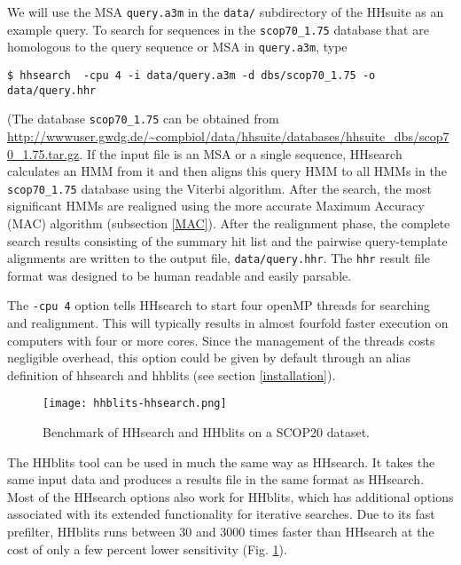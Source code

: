 \documentclass[11pt,a4paper]{article}
\begin{document}
We will use the MSA \verb`query.a3m` in the \verb`data/` subdirectory of the HHsuite as an example query. To search for sequences in the \verb`scop70_1.75` database that are homologous to the query sequence or MSA in \verb`query.a3m`, type

\begin{verbatim}
$ hhsearch  -cpu 4 -i data/query.a3m -d dbs/scop70_1.75 -o data/query.hhr
\end{verbatim}

(The database \verb`scop70_1.75` can be obtained from \url{http://wwwuser.gwdg.de/~compbiol/data/hhsuite/databases/hhsuite_dbs/scop70_1.75.tar.gz}. 
If the input file is an MSA or a single sequence, HHsearch calculates an HMM from it
and then aligns this query HMM to all HMMs in the \verb`scop70_1.75` database using the Viterbi 
algorithm. After the search, 
the most significant HMMs are realigned using the more accurate Maximum Accuracy (MAC) 
algorithm (subsection \ref{MAC}). After the realignment phase, the complete search results consisting of the 
summary hit list and the pairwise query-template alignments are written to the output file, \verb`data/query.hhr`.
The \verb`hhr` result file format was designed to be human readable and easily parsable.

The \verb`-cpu 4` option tells HHsearch to start four openMP threads for searching and realignment. This will typically results in almost fourfold faster execution on computers with four or more cores. Since the management of the threads costs negligible overhead, this option could be given by default through an alias definition of hhsearch and hhblits (see section \ref{installation}). 

\begin{figure}[h]
\begin{center}
\texttt{[image: hhblits-hhsearch.png]}
\caption{Benchmark of HHsearch and HHblits on a SCOP20 dataset.}
\label{fig:hhsearch_hhblits_bench}
\end{center}
\end{figure}

The HHblits tool can be used in much the same way as HHsearch. 
It takes the same input data and produces a results file in the same format as HHsearch.
Most of the HHsearch options also work for HHblits, which has
additional options associated with its extended functionality for iterative searches. 
Due to its fast prefilter, HHblits runs between 30 and 3000 times faster than HHsearch
at the cost of only a few percent lower sensitivity (Fig. \ref{fig:hhsearch_hhblits_bench}).
\end{document}
